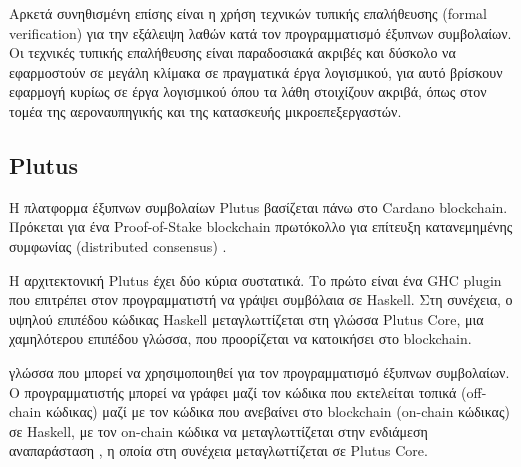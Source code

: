                   Αρκετά συνηθισμένη επίσης είναι η χρήση τεχνικών τυπικής επαλήθευσης (formal verification) για
                    την εξάλειψη λαθών κατά τον προγραμματισμό έξυπνων συμβολαίων. Οι τεχνικές τυπικής επαλήθευσης
                      είναι παραδοσιακά ακριβές και δύσκολο να εφαρμοστούν σε μεγάλη κλίμακα σε πραγματικά έργα
                        λογισμικού, για αυτό βρίσκουν εφαρμογή κυρίως σε έργα λογισμικού όπου τα λάθη στοιχίζουν ακριβά,
                          όπως στον τομέα της αεροναυπηγικής και της κατασκευής μικροεπεξεργαστών.
                            


                            \subsection{Plutus}
                             \label{subsec:plutus}

                             Η πλατφορμα έξυπνων συμβολαίων Plutus βασίζεται πάνω στο Cardano blockchain. Πρόκεται για ένα
                             Proof-of-Stake blockchain πρωτόκολλο για επίτευξη κατανεμημένης συμφωνίας (distributed consensus) \cite{ouroboros}. 

                             Η αρχιτεκτονική Plutus έχει δύο κύρια συστατικά. Το πρώτο είναι ένα GHC plugin που επιτρέπει στον
                             προγραμματιστή να γράψει συμβόλαια σε Haskell.  Στη συνέχεια, ο υψηλού επιπέδου κώδικας Haskell
                             μεταγλωττίζεται στη γλώσσα Plutus Core, μια χαμηλότερου επιπέδου γλώσσα, που προορίζεται να
                             κατοικήσει στο blockchain.


                              γλώσσα που μπορεί να χρησιμοποιηθεί για τον προγραμματισμό έξυπνων συμβολαίων. Ο προγραμματιστής 
                               μπορεί να γράφει μαζί τον κώδικα που εκτελείται τοπικά (off-chain κώδικας) μαζί με τον κώδικα που 
                                ανεβαίνει στο blockchain (on-chain κώδικας) σε Haskell, με τον on-chain κώδικα να μεταγλωττίζεται στην 
                                 ενδιάμεση αναπαράσταση \FIR{},  η οποία
                                  στη συνέχεια μεταγλωττίζεται σε Plutus Core.

